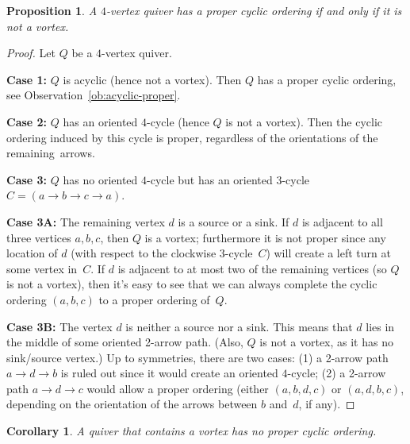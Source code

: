 \documentclass[11pt, letterpaper]{amsart}
\newtheorem{proposition}[theorem]{Proposition}
\newtheorem{corollary}[theorem]{Corollary}
\theoremstyle{definition}
\numberwithin{equation}{section}
\begin{document}
\begin{proposition}
\label{prop: vortex equiv to 4 vertex proper}
 A $4$-vertex quiver has a proper cyclic ordering if and only if it is not a vortex. 
\end{proposition}

\begin{proof}
Let $Q$ be a $4$-vertex quiver. %

\noindent
\textbf{Case 1:} $Q$ is acyclic (hence not a vortex).
Then $Q$ has a proper cyclic ordering, see Observation~\ref{ob:acyclic-proper}.


\noindent
\textbf{Case 2:} $Q$ has an oriented $4$-cycle (hence $Q$ is not a vortex). 
Then the cyclic ordering induced by this cycle is proper, regardless of the orientations of the remaining~arrows.

\noindent
\textbf{Case 3:} 
$Q$ has no oriented $4$-cycle but has an oriented $3$-cycle $C = (a \rightarrow b \rightarrow c \rightarrow a)$.

\noindent
\textbf{Case 3A:} 
The remaining vertex $d$ is a source or a sink. 
If $d$ is adjacent to all three vertices $a,b,c$, then $Q$ is a vortex;
furthermore it is not proper since  any location of $d$ (with respect to the clockwise 3-cycle~$C$)
will create a left turn at some vertex in~$C$.
If $d$ is adjacent to at most two of the remaining vertices (so $Q$ is not a vortex), 
then it's easy to see that we can always complete 
the cyclic ordering $(a,b,c)$ to a proper ordering of~$Q$. 

\pagebreak[3]

\noindent
\textbf{Case 3B:} 
The vertex $d$ is neither a source nor a sink. This means that $d$ lies in the middle of some oriented 2-arrow path.
(Also, $Q$ is not a vortex, as it has no sink/source vertex.) 
Up to symmetries, there are two cases: 
(1) a 2-arrow path $a \rightarrow d \rightarrow b$ is ruled out since it would create an oriented $4$-cycle; 
(2) a 2-arrow path $a \rightarrow d \rightarrow c$ would allow a proper ordering
(either $(a,b,d,c)$ or $(a,d,b,c)$, depending on the orientation of the arrows between $b$ and~$d$, if any). 
\end{proof}

\begin{corollary}
\label{cor:vortex improper}
A quiver that contains a vortex has no proper cyclic ordering. 
\end{corollary}
\end{document}
